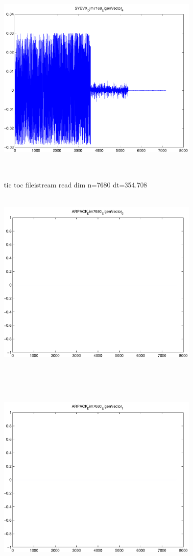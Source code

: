 \documentclass[9pt]{article}
\theoremstyle{plain}
\theoremstyle{definition}
\theoremstyle{remark}
\numberwithin{equation}{section}
\begin{document}
\includegraphics[width=10.0cm,height=10.0cm]{SYEVX_Dim7168_EigenVector_4.pdf}

tic toc fileistream read dim n=7680 dt=354.708
\includegraphics[width=10.0cm,height=10.0cm]{ARPACK_Dim7680_EigenVector_0.pdf}

\includegraphics[width=10.0cm,height=10.0cm]{ARPACK_Dim7680_EigenVector_1.pdf}
\end{document}
